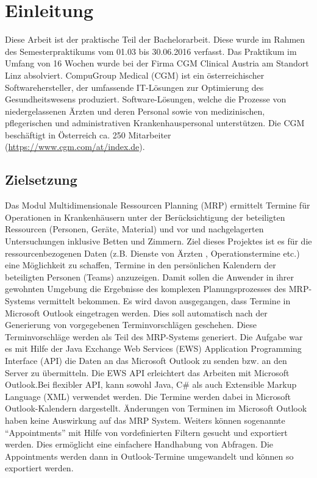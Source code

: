 \chapter{Einleitung}
Diese Arbeit ist der praktische Teil der Bachelorarbeit.  Diese wurde im Rahmen des Semesterpraktikums vom 01.03 bis 30.06.2016 verfasst. Das Praktikum im Umfang von 16 Wochen wurde bei der Firma CGM Clinical Austria am Standort Linz absolviert. CompuGroup Medical (CGM) ist ein österreichischer Softwarehersteller, der umfassende IT-Lösungen zur Optimierung des Gesundheitswesens produziert. Software-Lösungen, welche die Prozesse von niedergelassenen Ärzten und deren Personal sowie von medizinischen, pflegerischen und administrativen Krankenhauspersonal unterstützen. Die CGM beschäftigt in Österreich ca. 250 Mitarbeiter (\url{https://www.cgm.com/at/index.de}).

\section{Zielsetzung}
Das Modul Multidimensionale Ressourcen Planning (MRP) ermittelt Termine für Operationen in Krankenhäusern unter der Berücksichtigung der beteiligten Ressourcen (Personen, Geräte, Material) und vor und nachgelagerten Untersuchungen inklusive Betten und Zimmern. Ziel dieses Projektes ist es für die ressourcenbezogenen Daten (z.B. Dienste von Ärzten , Operationstermine etc.) eine Möglichkeit zu schaffen, Termine in den persönlichen Kalendern der beteiligten Personen (Teams) anzuzeigen. Damit sollen die Anwender in ihrer gewohnten Umgebung die Ergebnisse des komplexen Planungsprozesses des MRP-Systems vermittelt bekommen. Es wird davon ausgegangen, dass Termine in Microsoft Outlook eingetragen werden. Dies soll automatisch nach der Generierung von vorgegebenen Terminvorschlägen geschehen. Diese Terminvorschläge werden als Teil des MRP-Systems generiert. Die Aufgabe war es mit Hilfe der Java Exchange Web Services  (EWS) Application Programming Interface (API) die Daten an das  Microsoft Outlook zu senden bzw. an den Server zu übermitteln. Die EWS API erleichtert das Arbeiten mit  Microsoft Outlook.\newpage Bei flexibler API, kann sowohl Java, C\# als auch Extensible Markup Language (XML) verwendet werden. Die Termine werden dabei in Microsoft Outlook-Kalendern dargestellt. Änderungen von Terminen im Microsoft Outlook haben keine Auswirkung auf das MRP System. Weiters können sogenannte "`Appointments"' mit Hilfe von vordefinierten Filtern gesucht und exportiert werden. Dies ermöglicht eine einfachere Handhabung von Abfragen. Die Appointments werden dann in Outlook-Termine umgewandelt und können so exportiert werden. 